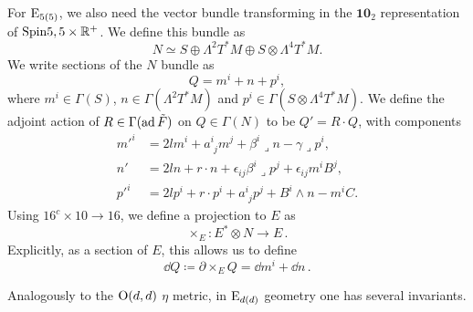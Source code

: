 \documentclass[debug]{phd}
\begin{document}
			For $\mathrm{E}_{5(5)}$, we also need the vector bundle transforming in the $\mathbf{10}_{2}$ representation of $\mathrm{Spin}{5,5}\times\mathbb{R}^{+}$. 
			We define this bundle as
					\begin{equation}
						N\simeq S\oplus\Lambda^{2}T^{*}M\oplus S\otimes\Lambda^{4}T^{*}M.
					\end{equation}
			We write sections of the $N$ bundle as
					\begin{equation}
						Q=m^{i}+n+p^{i},
					\end{equation}
			where $m^{i}\in\Gamma(S)$, $n\in\Gamma(\Lambda^{2}T^{*}M)$ and $p^{i}\in\Gamma(S\otimes\Lambda^{4}T^{*}M)$. 
			We define the adjoint action of $R\in\Gamma(\operatorname{ad} \tilde{F})$ on $Q\in\Gamma(N)$ to be $Q'=R\cdot Q$, with components
					\begin{equation}\label{Q_adj_IIB}
						\begin{split}
							m'^{i} & =2lm^{i}+a_{\phantom{i}j}^{i}m^j+\beta^{i}\lrcorner n-\gamma\lrcorner p^{i},\\
							n' & =2ln+r\cdot n+\epsilon_{ij}\beta^{i}\lrcorner p^{j}+\epsilon_{ij}m^{i}B^{j},\\
							p'^{i} & =2lp^{i}+r\cdot p^{i}+a_{\phantom{i}j}^{i}p^{j}+B^{i}\wedge n-m^{i}C.
						\end{split}
					\end{equation}
			Using $\mathrm{16}^{c} \times \mathrm{10}\rightarrow\mathrm{16}$, we define a projection to $E$ as
					\begin{equation}
						\times_E : E^{*}\otimes N\rightarrow E \, .
					\end{equation}
			Explicitly, as a section of $E$, this allows us to define 
					\begin{equation}\label{e5_proj_IIB}
						\dd Q \coloneqq \partial\times_E Q = \dd m^{i}+\dd n \, .
					\end{equation}
			
			Analogously to the $\mathrm{O}(d,d)$ $\eta$ metric, in $\mathrm{E}_{d(d)}$ geometry one has several invariants.
			
\end{document}
